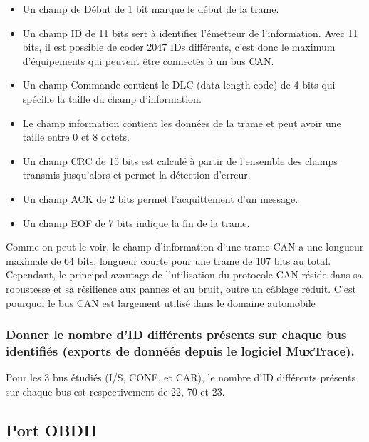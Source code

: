 \documentclass{rapportECC}
\begin{document}
\begin{itemize}
    \item Un champ de Début de 1 bit marque le début de la trame.
    \item Un champ ID de 11 bits sert à identifier l'émetteur de l'information. Avec 11 bits, il est possible de coder 2047 IDs différents, c'est donc le maximum d'équipements qui peuvent être connectés à un bus CAN.
    \item Un champ Commande contient le DLC (data length code) de 4 bits qui spécifie la taille du champ d'information.
    \item Le champ information contient les données de la trame et peut avoir une taille entre 0 et 8 octets.
    \item Un champ CRC de 15 bits est calculé à partir de l'ensemble des champs transmis jusqu'alors et permet la détection d'erreur.
    \item Un champ ACK de 2 bits permet l'acquittement d'un message.
    \item Un champ EOF de 7 bits indique la fin de la trame.
\end{itemize}


Comme on peut le voir, le champ d'information d'une trame CAN a une longueur maximale de 64 bits, longueur courte pour une trame de 107 bits au total. Cependant, le principal avantage de l'utilisation du protocole CAN réside dans sa robustesse et sa résilience aux pannes et au bruit, outre un câblage réduit. C'est pourquoi le bus CAN est largement utilisé dans le domaine automobile


\subsubsection*{Donner le nombre d'ID différents présents sur chaque bus identifiés (exports de donnéés depuis le logiciel MuxTrace).}

Pour les 3 bus étudiés (I/S, CONF, et CAR), le nombre d'ID différents présents sur chaque bus est respectivement de 22, 70 et 23.


\subsection{Port OBDII}
\end{document}

